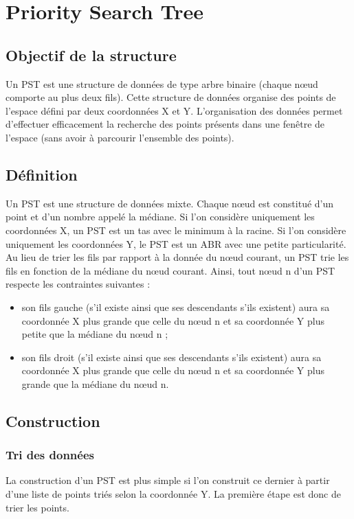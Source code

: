 \documentclass[10pt,a4paper]{article}
\begin{document}
\section{Priority Search Tree}

\subsection{Objectif de la structure}
Un PST est une structure de données de type arbre binaire (chaque nœud comporte au plus deux fils). Cette structure de données organise des points de l'espace défini par deux coordonnées X et Y. L'organisation des données permet d'effectuer efficacement la recherche des points présents dans une fenêtre de l'espace (sans avoir à parcourir l'ensemble des points).

\subsection{Définition}
Un PST est une structure de données mixte. Chaque nœud est constitué d'un point et d'un nombre appelé la médiane. Si l'on considère uniquement les coordonnées X, un PST est un tas avec le minimum à la racine. Si l'on considère uniquement les coordonnées Y, le PST est un ABR avec une petite particularité. Au lieu de trier les fils par rapport à la donnée du nœud courant, un PST trie les fils en fonction de la médiane du nœud courant. Ainsi, tout nœud n d'un PST respecte les contraintes suivantes :
\begin{itemize}
	\item son fils gauche (s'il existe ainsi que ses descendants s'ils existent) aura sa coordonnée X plus grande que celle du nœud n et sa coordonnée Y plus petite que la médiane du nœud n ;
	\item son fils droit (s'il existe ainsi que ses descendants s'ils existent) aura sa coordonnée X plus grande que celle du nœud n et sa coordonnée Y plus grande que la médiane du nœud n.
\end{itemize}

\subsection{Construction}

\subsubsection{Tri des données}
La construction d'un PST est plus simple si l'on construit ce dernier à partir d'une liste de points triés selon la coordonnée Y. La première étape est donc de trier les points.
\end{document}
